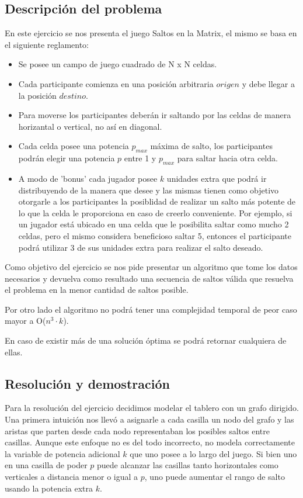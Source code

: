 \subsection{Descripci\'on del problema}

En este ejercicio se nos presenta el juego Saltos en la Matrix, el mismo se basa en el siguiente reglamento:

\begin{itemize}
\item Se posee un campo de juego cuadrado de N x N celdas.
\item Cada participante comienza en una posici\'on arbitraria $origen$ y debe llegar a la posici\'on $destino$.
\item Para moverse los participantes deber\'an ir saltando por las celdas de manera horizantal o vertical, no as\'i en diagonal.
\item Cada celda posee una potencia $p_{max}$ m\'axima de salto, los participantes podr\'an elegir una potencia $p$ entre 1 y $p_{max}$ para saltar hacia otra celda.
\item A modo de 'bonus' cada jugador posee $k$ unidades extra que podr\'a ir distribuyendo de la manera que desee y las mismas tienen como objetivo otorgarle a los participantes la posiblidad de realizar un salto m\'as potente de lo que la celda le proporciona en caso de creerlo conveniente. Por ejemplo, si un jugador est\'a ubicado en una celda que le posibilita saltar como mucho 2 celdas, pero el mismo considera beneficioso saltar 5, entonces el participante podr\'a utilizar 3 de sus unidades extra para realizar el salto deseado.
\end{itemize}

Como objetivo del ejercicio se nos pide presentar un algoritmo que tome los datos necesarios y devuelva como resultado una secuencia de saltos v\'alida que resuelva el problema en la menor cantidad de saltos posible.

Por otro lado el algoritmo no podr\'a tener una complejidad temporal de peor caso mayor a O($n^3 \cdot k$).

En caso de existir m\'as de una soluci\'on \'optima se podr\'a retornar cualquiera de ellas.


\subsection{Resoluci\'on y demostraci\'on}

Para la resoluci\'on del ejercicio decidimos modelar el tablero con un grafo dirigido. Una primera intuici\'on nos llev\'o a asignarle a cada casilla un nodo del grafo y las aristas que parten desde cada nodo representaban los posibles saltos entre casillas. Aunque este enfoque no es del todo incorrecto, no modela correctamente la variable de potencia adicional $k$ que uno posee a lo largo del juego. Si bien uno en una casilla de poder $p$ puede alcanzar las casillas tanto horizontales como verticales a distancia menor o igual a $p$, uno puede aumentar el rango de salto usando la potencia extra $k$. \\

